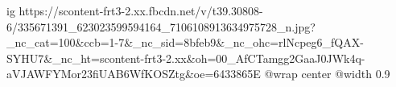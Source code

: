  
 
 
 
 

\ifcmt
  ig https://scontent-frt3-2.xx.fbcdn.net/v/t39.30808-6/335671391_623023599594164_7106108913634975728_n.jpg?_nc_cat=100&ccb=1-7&_nc_sid=8bfeb9&_nc_ohc=rlNcpeg6_fQAX-SYHU7&_nc_ht=scontent-frt3-2.xx&oh=00_AfCTamgg2GaaJ0JWk4q-aVJAWFYMor23fiUAB6WfKOSZtg&oe=6433865E
  @wrap center
  @width 0.9
\fi

